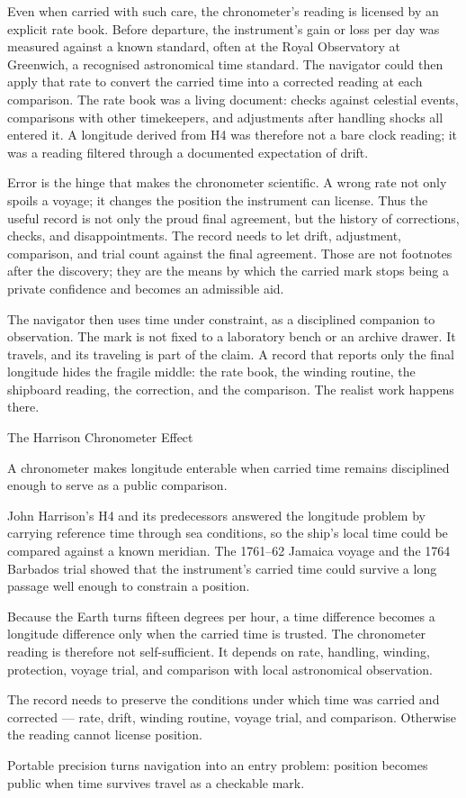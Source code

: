 Even when carried with such care, the chronometer's reading is licensed
by an explicit rate book. Before departure, the instrument's gain or
loss per day was measured against a known standard, often at the Royal
Observatory at Greenwich, a recognised astronomical time standard. The navigator could then apply that rate to convert the
carried time into a corrected reading at each comparison. The rate book
was a living document: checks against celestial events, comparisons with
other timekeepers, and adjustments after handling shocks all entered it.
A longitude derived from H4 was therefore not a bare clock reading; it
was a reading filtered through a documented expectation of drift.

Error is the hinge that makes the chronometer scientific. A wrong rate
not only spoils a voyage; it changes the position the instrument can
license. Thus the useful record is not only the proud final agreement,
but the history of corrections, checks, and disappointments. The record
needs to let drift, adjustment, comparison, and trial count against the
final agreement. Those are not footnotes after the discovery; they are
the means by which the carried mark stops being a private confidence and
becomes an admissible aid.

The navigator then uses time under constraint, as a disciplined companion
to observation. The mark is not fixed to a laboratory bench or an
archive drawer. It travels, and its traveling is part of the claim. A
record that reports only the final longitude hides the fragile middle:
the rate book, the winding routine, the shipboard reading, the
correction, and the comparison. The realist work happens there.

\begin{phenom}{The Harrison Chronometer Effect~\cite{gould1923chronometer}}
\label{ph:harrison-chronometer}

\PhStatement
A chronometer makes longitude enterable when carried time remains disciplined
enough to serve as a public comparison.

\PhOrigin
John Harrison's H4 and its predecessors answered the longitude problem by
carrying reference time through sea conditions, so the ship's local time
could be compared against a known meridian. The 1761--62 Jamaica voyage
and the 1764 Barbados trial showed that the instrument's carried time
could survive a long passage well enough to constrain a position.

\PhObservation
Because the Earth turns fifteen degrees per hour, a time difference
becomes a longitude difference only when the carried time is trusted. The
chronometer reading is therefore not self-sufficient. It depends on rate,
handling, winding, protection, voyage trial, and comparison with local
astronomical observation.

\PhConstraint
The record needs to preserve the conditions under which time was carried
and corrected --- rate, drift, winding routine, voyage trial, and
comparison. Otherwise the reading cannot license position.

\PhConsequence
Portable precision turns navigation into an entry problem: position becomes
public when time survives travel as a checkable mark.
\end{phenom}

